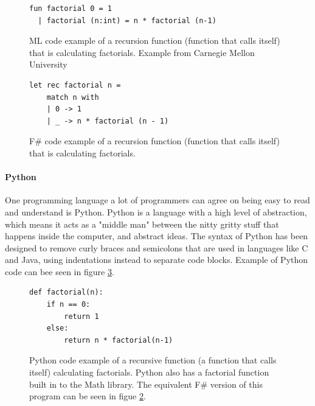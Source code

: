 \documentclass[12pt, a4paper]{article}
\begin{document}
\begin{figure}[!h]
	\begin{lstlisting}
fun factorial 0 = 1
  | factorial (n:int) = n * factorial (n-1)
	\end{lstlisting}
	\caption{ML code example of a recursion function (function that calls itself) that is calculating factorials. Example from Carnegie Mellon University\cite{carnegieMellon}}
	\label{fig:factorialMLExample}
\end{figure}

\begin{figure}[!h]
	\begin{lstlisting}
let rec factorial n =
    match n with
    | 0 -> 1
    | _ -> n * factorial (n - 1)
	\end{lstlisting}
	\caption{F\# code example of a recursion function (function that calls itself) that is calculating factorials.}
	\label{fig:factorialFsharpExample}
\end{figure}

\newpage
\paragraph{Python}

One programming language a lot of programmers can agree on being easy to read and understand is Python. Python is a language with a high level of abstraction, which means it acts as a "middle man" between the nitty gritty stuff that happens inside the computer, and abstract ideas. The syntax of Python has been designed to remove curly braces and semicolons that are used in languages like C and Java, using indentations instead to separate code blocks. Example of Python code can bee seen in figure \ref{fig:pythonFactorial}.\\


\begin{figure}[!h]
	\begin{lstlisting}
def factorial(n):
    if n == 0:
        return 1
    else:
        return n * factorial(n-1)
	\end{lstlisting}
	\caption{Python code example of a recursive function (a function that calls itself) calculating factorials. Python also has a factorial function built in to the Math library. The equivalent F\# version of this program can be seen in figue \ref{fig:factorialFsharpExample}.}
	\label{fig:pythonFactorial}
\end{figure}
\end{document}
